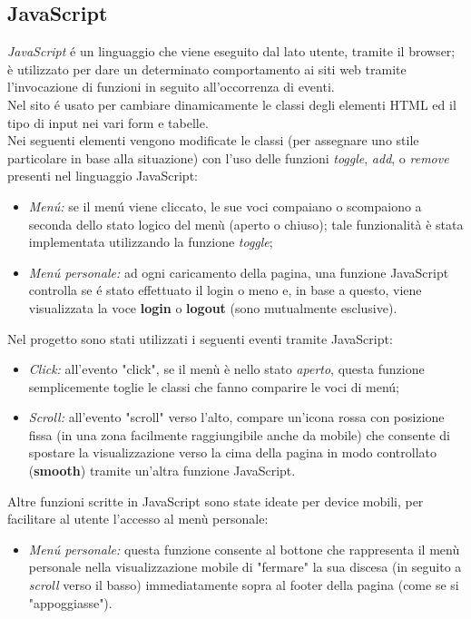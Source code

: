 \documentclass[]{article}
\begin{document}
\subsection{JavaScript} %
\textit{JavaScript} é un linguaggio che viene eseguito dal lato utente, tramite il browser; è utilizzato per dare un determinato comportamento ai siti web tramite l'invocazione di funzioni in seguito all'occorrenza di eventi.\\
Nel sito é usato per cambiare dinamicamente le classi degli elementi HTML ed il tipo di input nei vari form e tabelle.\\
Nei seguenti elementi vengono modificate le classi (per assegnare uno stile particolare in base alla situazione) con l'uso delle funzioni \textit{toggle}, \textit{add}, o \textit{remove} presenti nel linguaggio JavaScript:
\begin{itemize}
        \item \textit{Menú:} se il menú viene cliccato, le sue voci compaiano o scompaiono a seconda dello stato logico del menù (aperto o chiuso); tale funzionalità è stata implementata utilizzando la funzione \textit{toggle};
        \item \textit{Menú personale:} ad ogni caricamento della pagina, una funzione JavaScript controlla se é stato effettuato il login o meno e, in base a questo, viene visualizzata la voce \textbf{login} o \textbf{logout} (sono mutualmente esclusive).
\end{itemize}
Nel progetto sono stati utilizzati i seguenti eventi tramite JavaScript:
\begin{itemize}
        \item \textit{Click:} all'evento "click", se il menù è nello stato \textit{aperto}, questa funzione semplicemente toglie le classi che fanno comparire le voci di menú;
        \item \textit{Scroll:} all'evento "scroll" verso l'alto, compare un'icona rossa con posizione fissa (in una zona facilmente raggiungibile anche da mobile) che consente di spostare la visualizzazione verso la cima della pagina in modo controllato (\textbf{smooth}) tramite un'altra funzione JavaScript.
\end{itemize}
Altre funzioni scritte in JavaScript sono state ideate per device mobili, per facilitare al utente l'accesso al menù personale:
\begin{itemize}
        \item \textit{Menú personale:} questa funzione consente al bottone che rappresenta il menù personale nella visualizzazione mobile di "fermare" la sua discesa (in seguito a \textit{scroll} verso il basso) immediatamente sopra al footer della pagina (come se si "appoggiasse").
\end{itemize}
\end{document}
